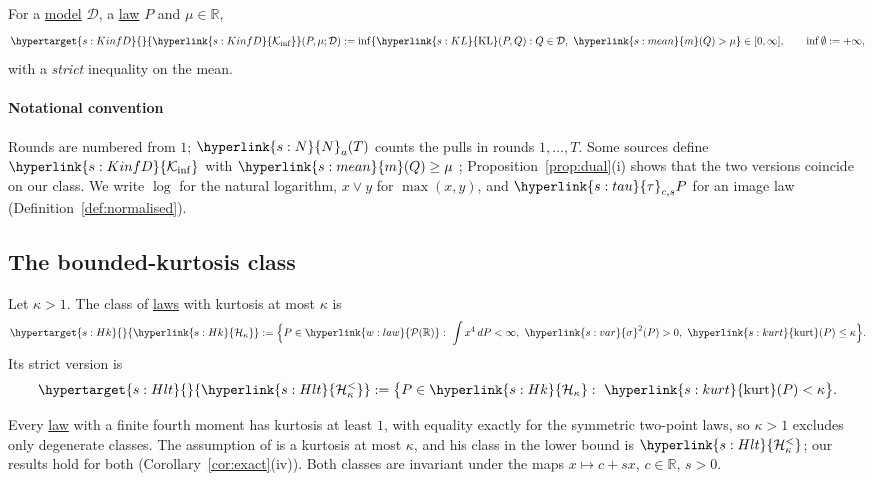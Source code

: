 \documentclass[11pt]{article}
\newcommand{\R}{\mathbb{R}}
\newcommand{\Pspace}{\term{w:law}{\mathcal{P}(\mathbb{R})}}
\newcommand{\dt}[1]{\hypertarget{#1}{}}
\newcommand{\sy}[2]{{\hyperlink{#1}{#2}}}
\newcommand{\term}[2]{\hyperlink{#1}{#2}}
\newcommand{\mean}{\sy{s:mean}{m}}
\newcommand{\sd}{\sy{s:var}{\sigma}}
\newcommand{\kurt}{\sy{s:kurt}{\mathrm{kurt}}}
\newcommand{\KL}{\sy{s:KL}{\mathrm{KL}}}
\newcommand{\Kinf}{\sy{s:KinfD}{\mathcal{K}_{\inf}}}
\newcommand{\Hk}{\sy{s:Hk}{\mathcal{H}_{\kappa}}}
\newcommand{\Hlt}{\sy{s:Hlt}{\mathcal{H}^{<}_{\kappa}}}
\newcommand{\tauc}{\sy{s:tau}{\tau}}
\newcommand{\Np}{\sy{s:N}{N}}
\begin{document}
\begin{definition}\label{def:kinfD}
For a \term{w:model}{model} $\mathcal D$, a \term{w:law}{law} $P$ and $\mu\in\R$,
\begin{equation*}
  \dt{s:KinfD}\Kinf(P,\mu;\mathcal D):=\inf\{\KL(P,Q):Q\in\mathcal D,\ \mean(Q)>\mu\}\in[0,\infty],\qquad\inf\emptyset:=+\infty,
\end{equation*}
with a \emph{strict} inequality on the mean.
\end{definition}

\paragraph{Notational convention} Rounds are numbered from $1$; $\Np_a(T)$ counts the pulls in rounds
$1,\dots,T$. Some sources define $\Kinf$ with $\mean(Q)\ge\mu$ \citep{AJK21,PA26}; Proposition~\ref{prop:dual}(i)
shows that the two versions coincide on our class. We write $\log$ for the natural logarithm, $x\vee y$
for $\max(x,y)$, and $\tauc_{c,s}P$ for an image law (Definition~\ref{def:normalised}).

\subsection{The bounded-kurtosis class}

\begin{definition}\label{def:class}
Let $\kappa>1$. The class of \term{w:law}{laws} with kurtosis at most $\kappa$ is
\begin{equation*}
  \dt{s:Hk}\Hk:=\Bigl\{P\in\Pspace:\ \int x^4\,dP<\infty,\ \sd^2(P)>0,\ \kurt(P)\le\kappa\Bigr\}.
\end{equation*}
Its strict version is
\begin{equation*}
  \dt{s:Hlt}\Hlt:=\bigl\{P\in\Hk:\ \kurt(P)<\kappa\bigr\}.
\end{equation*}
\end{definition}

Every \term{w:law}{law} with a finite fourth moment has kurtosis at least $1$, with equality exactly for the
symmetric two-point laws, so $\kappa>1$ excludes only degenerate classes. The assumption of
\citet[Section~3]{L17} is a kurtosis at most $\kappa$, and his class in the lower bound is $\Hlt$; our results hold
for both (Corollary~\ref{cor:exact}(iv)). Both classes are invariant under the maps $x\mapsto c+sx$, $c\in\R$,
$s>0$.
\end{document}
